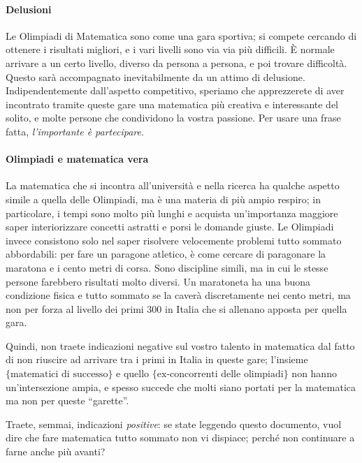 \documentclass[a4paper,10pt]{paper}
\begin{document}
\paragraph{Delusioni} Le Olimpiadi di Matematica sono come una gara sportiva; si compete cercando di ottenere i risultati migliori, e i vari livelli sono via via più difficili. È normale arrivare a un certo livello, diverso da persona a persona, e poi trovare difficoltà. Questo sarà accompagnato inevitabilmente da un attimo di delusione. Indipendentemente dall'aspetto competitivo, speriamo che apprezzerete di aver incontrato tramite queste gare una matematica più creativa e interessante del solito, e molte persone che condividono la vostra passione. Per usare una frase fatta, \emph{l'importante è partecipare}.

\paragraph{Olimpiadi e matematica vera}
 La matematica che si incontra all'università e nella ricerca ha qualche aspetto simile a quella delle Olimpiadi, ma è una materia di più ampio respiro; in particolare, i tempi sono molto più lunghi e acquista un'importanza maggiore saper interiorizzare concetti astratti e porsi le domande giuste. Le Olimpiadi invece consistono solo nel saper risolvere velocemente problemi tutto sommato abbordabili: per fare un paragone atletico, è come cercare di paragonare la maratona e i cento metri di corsa. Sono discipline simili, ma in cui le stesse persone farebbero risultati molto diversi. Un maratoneta ha una buona condizione fisica e tutto sommato se la caverà discretamente nei cento metri, ma non per forza al livello dei primi 300 in Italia che si allenano apposta per quella gara.
 
 Quindi, non traete indicazioni negative sul vostro talento in matematica dal fatto di non riuscire ad arrivare tra i primi in Italia in queste gare; l'insieme $\{\text{matematici di successo}\}$ e quello $\{\text{ex-concorrenti delle olimpiadi}\}$ non hanno un'intersezione ampia, e spesso succede che molti siano portati per la matematica ma non per queste ``garette''.
 
 Traete, semmai, indicazioni \emph{positive}: se state leggendo questo documento, vuol dire che fare matematica tutto sommato non vi dispiace; perché non continuare a farne anche più avanti?
 
\end{document}
